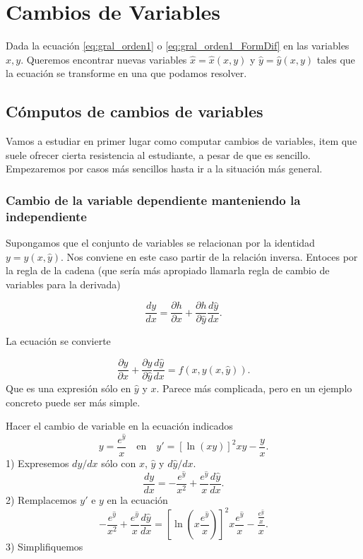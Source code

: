 \section{Cambios de Variables}

\begin{problema}
 Dada la ecuación \eqref{eq:gral_orden1} o \eqref{eq:gral_orden1_FormDif} en las variables $x,y$. Queremos encontrar nuevas variables $\hat{x}=\hat{x}(x,y)$ y $\hat{y}=\hat{y}(x,y)$ tales que la ecuación se transforme en una que podamos resolver.
\end{problema}






\subsection{Cómputos de cambios de variables}
Vamos a estudiar en primer lugar como computar cambios de variables, item que suele ofrecer cierta resistencia al estudiante, a pesar de que es sencillo. Empezaremos por casos más sencillos hasta ir a la situación más general.

\subsubsection{Cambio de la variable dependiente manteniendo la independiente}

Supongamos que el conjunto de variables se relacionan  por la identidad $y=y(x,\hat{y})$. Nos conviene en este caso partir de la relación inversa. Entoces por la regla de la cadena (que sería más apropiado llamarla regla de cambio de variables para la derivada)

\[\frac{dy}{dx}=\frac{\partial h}{\partial x}+\frac{\partial h}{\partial \hat{y}}\frac{d\hat{y}}{dx}.\]

La ecuación se convierte

\[\frac{\partial y}{\partial x}+\frac{\partial y}{\partial \hat{y}}\frac{d\hat{y}}{dx}=f(x,y(x,\hat{y})).\]
Que es una expresión sólo en $\hat{y}$ y $x$. Parece más complicada, pero en un ejemplo concreto puede ser más simple.







\begin{ejemplo} Hacer el cambio de variable en la  ecuación indicados
\[y=\frac{e^{\hat{y}}}{x}\quad\text{en}\quad  y'=\left[\ln(xy)\right]^2xy-\frac{y}{x}.\]
 1) Expresemos $dy/dx$ sólo con $x$, $\hat{y}$ y $d\hat{y}/dx$.
\[\frac{dy}{dx}=-\frac{e^{\hat{y}}}{x^2}+\frac{e^{\hat{y}}}{x}\frac{d\hat{y}}{dx}.\]
 2) Remplacemos $y'$ e $y$ en la ecuación
\[-\frac{e^{\hat{y}}}{x^2}+\frac{e^{\hat{y}}}{x}\frac{d\hat{y}}{dx}=\left[\ln\left(x \frac{e^{\hat{y}}}{x} \right)\right]^2x\frac{e^{\hat{y}}}{x}-\frac{\frac{e^{\hat{y}}}{x} }{x}.\]
 3) Simplifiquemos




\end{ejemplo}

